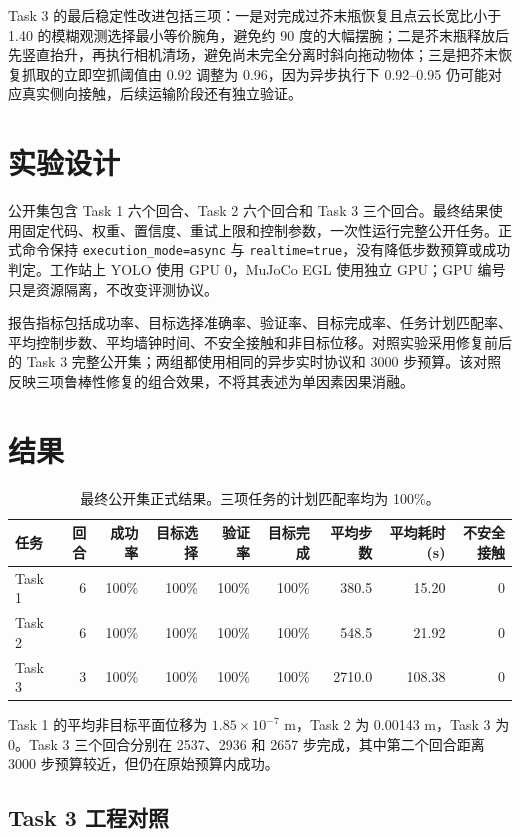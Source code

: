 \documentclass[11pt,a4paper]{ctexart}
\begin{document}
Task 3 的最后稳定性改进包括三项：一是对完成过芥末瓶恢复且点云长宽比小于 1.40 的模糊观测选择最小等价腕角，避免约 90 度的大幅摆腕；二是芥末瓶释放后先竖直抬升，再执行相机清场，避免尚未完全分离时斜向拖动物体；三是把芥末恢复抓取的立即空抓阈值由 0.92 调整为 0.96，因为异步执行下 0.92--0.95 仍可能对应真实侧向接触，后续运输阶段还有独立验证。

\section{实验设计}

公开集包含 Task 1 六个回合、Task 2 六个回合和 Task 3 三个回合。最终结果使用固定代码、权重、置信度、重试上限和控制参数，一次性运行完整公开任务。正式命令保持 \texttt{execution\_mode=async} 与 \texttt{realtime=true}，没有降低步数预算或成功判定。工作站上 YOLO 使用 GPU 0，MuJoCo EGL 使用独立 GPU；GPU 编号只是资源隔离，不改变评测协议。

报告指标包括成功率、目标选择准确率、验证率、目标完成率、任务计划匹配率、平均控制步数、平均墙钟时间、不安全接触和非目标位移。对照实验采用修复前后的 Task 3 完整公开集；两组都使用相同的异步实时协议和 3000 步预算。该对照反映三项鲁棒性修复的组合效果，不将其表述为单因素因果消融。

\section{结果}

\begin{table}[htbp]
\centering
\small
\begin{tabular}{lrrrrrrrr}
\toprule
任务 & 回合 & 成功率 & 目标选择 & 验证率 & 目标完成 & 平均步数 & 平均耗时(s) & 不安全接触 \\
\midrule
Task 1 & 6 & 100\% & 100\% & 100\% & 100\% & 380.5 & 15.20 & 0 \\
Task 2 & 6 & 100\% & 100\% & 100\% & 100\% & 548.5 & 21.92 & 0 \\
Task 3 & 3 & 100\% & 100\% & 100\% & 100\% & 2710.0 & 108.38 & 0 \\
\bottomrule
\end{tabular}
\caption{最终公开集正式结果。三项任务的计划匹配率均为 100\%。}
\end{table}

Task 1 的平均非目标平面位移为 $1.85\times10^{-7}$ m，Task 2 为 0.00143 m，Task 3 为 0。Task 3 三个回合分别在 2537、2936 和 2657 步完成，其中第二个回合距离 3000 步预算较近，但仍在原始预算内成功。

\subsection{Task 3 工程对照}
\end{document}
